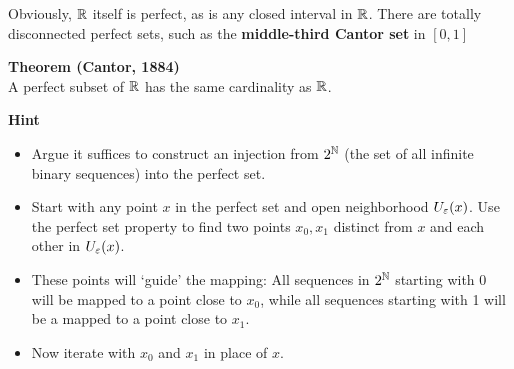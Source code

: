 Obviously, $\mathbb{R}$ itself is perfect, as is any closed interval in $\mathbb{R}$. There are totally disconnected perfect sets, such as the \textbf{middle-third Cantor set} in $[0,1]$

\begin{framed}
\textbf{Theorem (Cantor, 1884)}\\
A perfect subset of $\mathbb{R}$ has the same cardinality as $\mathbb{R}$.
\end{framed}

\begin{framed}
\textbf{Hint}\\
\begin{itemize}
\item Argue it suffices to construct an injection from $2^{\mathbb{N}}$ (the set of all infinite binary sequences) into the perfect set.
\item Start with any point $x$ in the perfect set and open neighborhood $U_\varepsilon(x)$. Use the perfect set property to find two points $x_0, x_1$ distinct from $x$ and each other in $U_\varepsilon(x)$.
\item These points will `guide' the mapping: All sequences in $2^{\mathbb{N}}$ starting with 0 will be mapped to a point close to $x_0$, while all sequences starting with 1 will be a mapped to a point close to $x_1$.
\item Now iterate with $x_0$ and $x_1$ in place of $x$.
\end{itemize}
\end{framed}

